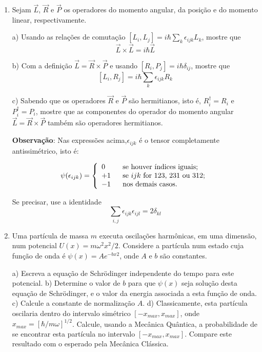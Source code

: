 \begin{enumerate}[start=1,label={\bfseries Q\arabic*.}]
\item Sejam $\vec{L}$, $\vec{R}$ e $\vec{P}$ os operadores do momento angular, da posição e do momento linear, respectivamente.


a) Usando as relações de comutação $\left[L_{i}, L_{j}\right]=i \hbar \sum_{k} \epsilon_{i j k} L_{k}$, mostre que
$$
\vec{L} \times \vec{L}=i \hbar \vec{L}
$$

b) Com a definição $\vec{L} = \vec{R} \times \vec{P}$ e usando $\left[R_{i}, P_{j}\right]=i \hbar \delta_{i j}$, mostre que
$$
\left[L_{i}, R_{j}\right]=i \hbar \sum_{k} \epsilon_{i j k} R_{k}
$$

c) Sabendo que os operadores $\vec{R}$ e $\vec{P}$ são hermitianos, isto é, $R^{\dagger}_{i} = R_{i}$ e $P^{\dagger}_{i} = P_{i}$, mostre que
as componentes do operador do momento angular $\vec{L} = \vec{R} \times \vec{P}$ também são operadores hermitianos.

\textbf{Observação}: Nas expressões acima,$\epsilon_{i j k}$ é o tensor completamente antissimétrico, isto é:

$$
\psi(\epsilon_{ijk}) = \left\{\begin{array}{l l l} 0   &  \mbox{ se houver índices iguais;} \\     +1  \ & \mbox{ se $ijk$ for 123, 231 ou 312;}  \\ -1  & \mbox{ nos demais casos.} \end{array}\right.
$$

Se precisar, use a identidade \[ \sum_{i, j} \epsilon_{i j k} \epsilon_{i j l}=2 \delta_{k l} \]





\item Uma partícula de massa $m$ executa oscilações harmônicas, em uma dimensão, num potencial $U(x) = m \omega^{2}x^{2}/2$. Considere a partícula num estado cuja função de onda é $\psi(x) = Ae^{-bx^{}2}$, onde $A$ e $b$ são constantes.

a) Escreva a equação de Schrödinger independente do tempo para este potencial.
b) Determine o valor de $b$ para que $\psi(x)$ seja solução desta equação de Schrödinger, e o valor da energia associada a esta função de onda.
c) Calcule a constante de normalização $A$.
d) Classicamente, esta partícula oscilaria dentro do intervalo simétrico $[-x_{max},x_{max}]$, onde $x_{max} = [\hbar/m\omega]^{1/2}$. Calcule, usando a Mecânica Quântica, a probabilidade de se encontrar esta partícula no intervalo $[-x_{max},x_{max}]$. Compare este resultado com o esperado pela Mecânica Clássica.






\end{enumerate}

